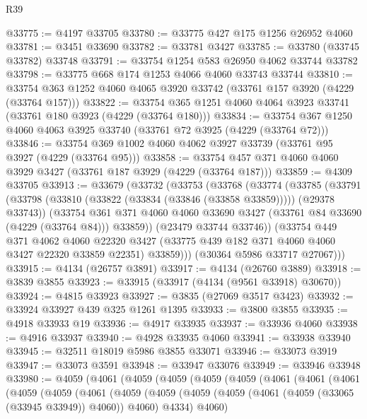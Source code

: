\begin{lexlean}{R39}
\begin{coremodule}
@33775 := @4197 @33705
@33780 := @33775 @427 @175 @1256 @26952 @4060
@33781 := @3451 @33690
@33782 := @33781 @3427
@33785 := @33780 (@33745 @33782) @33748
@33791 := @33754 @1254 @583 @26950 @4062 @33744 @33782
@33798 := @33775 @668 @174 @1253 @4066 @4060 @33743 @33744
@33810 := @33754 @363 @1252 @4060 @4065 @3920 @33742 (@33761 @157 @3920 (@4229 (@33764 @157)))
@33822 := @33754 @365 @1251 @4060 @4064 @3923 @33741 (@33761 @180 @3923 (@4229 (@33764 @180)))
@33834 := @33754 @367 @1250 @4060 @4063 @3925 @33740 (@33761 @72 @3925 (@4229 (@33764 @72)))
@33846 := @33754 @369 @1002 @4060 @4062 @3927 @33739 (@33761 @95 @3927 (@4229 (@33764 @95)))
@33858 := @33754 @457 @371 @4060 @4060 @3929 @3427 (@33761 @187 @3929 (@4229 (@33764 @187)))
@33859 := @4309 @33705
@33913 := @33679
    (@33732
      (@33753
        (@33768
          (@33774
            (@33785
              (@33791
                (@33798 (@33810 (@33822 (@33834 (@33846 (@33858 @33859))))) (@29378 @33743))
                (@33754
                  @361
                  @371
                  @4060
                  @4060
                  @33690
                  @3427
                  (@33761 @84 @33690 (@4229 (@33764 @84)))
                  @33859))
              (@23479 @33744 @33746))
            (@33754
              @449
              @371
              @4062
              @4060
              @22320
              @3427
              (@33775 @439 @182 @371 @4060 @4060 @3427 @22320 @33859 @22351)
              @33859)))
        (@30364 @5986 @33717 @27067)))
@33915 := @4134 (@26757 @3891)
@33917 := @4134 (@26760 @3889)
@33918 := @3839 @3855
@33923 := @33915 (@33917 (@4134 (@9561 @33918) @30670))
@33924 := @4815 @33923
@33927 := @3835 (@27069 @3517 @3423)
@33932 := @33924 @33927 @439 @325 @1261 @1395
@33933 := @3800 @3855
@33935 := @4918 @33933 @19
@33936 := @4917 @33935
@33937 := @33936 @4060
@33938 := @4916 @33937
@33940 := @4928 @33935 @4060
@33941 := @33938 @33940
@33945 := @32511 @18019 @5986 @3855 @33071
@33946 := @33073 @3919
@33947 := @33073 @3591
@33948 := @33947 @33076
@33949 := @33946 @33948
@33980 := @4059
    (@4061
      (@4059
        (@4059
          (@4059
            (@4059
              (@4061
                (@4061
                  (@4061
                    (@4059
                      (@4059
                        (@4061
                          (@4059
                            (@4059
                              (@4059
                                (@4059 (@4061 (@4059 (@33065 (@33945 @33949)) @4060)) @4060)
                                @4334)
                              @4060)

\end{coremodule}
\end{lexlean}
